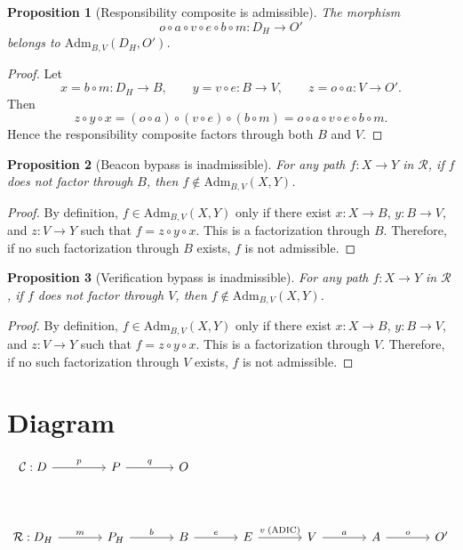 \documentclass[11pt]{article}
\newtheorem{proposition}{Proposition}
\begin{document}
\begin{proposition}[Responsibility composite is admissible]
The morphism
\[
  o\circ a\circ v\circ e\circ b\circ m:D_H\to O'
\]
belongs to $\mathrm{Adm}_{B,V}(D_H,O')$.
\end{proposition}

\begin{proof}
Let
\[
  x=b\circ m:D_H\to B,\qquad
  y=v\circ e:B\to V,\qquad
  z=o\circ a:V\to O'.
\]
Then
\[
  z\circ y\circ x
  =
  (o\circ a)\circ(v\circ e)\circ(b\circ m)
  =
  o\circ a\circ v\circ e\circ b\circ m.
\]
Hence the responsibility composite factors through both $B$ and $V$.
\end{proof}

\begin{proposition}[Beacon bypass is inadmissible]
For any path $f:X\to Y$ in $\mathcal{R}$, if $f$ does not factor through $B$,
then $f\notin \mathrm{Adm}_{B,V}(X,Y)$.
\end{proposition}

\begin{proof}
By definition, $f\in\mathrm{Adm}_{B,V}(X,Y)$ only if there exist
$x:X\to B$, $y:B\to V$, and $z:V\to Y$ such that
$f=z\circ y\circ x$.  This is a factorization through $B$.  Therefore, if no
such factorization through $B$ exists, $f$ is not admissible.
\end{proof}

\begin{proposition}[Verification bypass is inadmissible]
For any path $f:X\to Y$ in $\mathcal{R}$, if $f$ does not factor through $V$,
then $f\notin \mathrm{Adm}_{B,V}(X,Y)$.
\end{proposition}

\begin{proof}
By definition, $f\in\mathrm{Adm}_{B,V}(X,Y)$ only if there exist
$x:X\to B$, $y:B\to V$, and $z:V\to Y$ such that
$f=z\circ y\circ x$.  This is a factorization through $V$.  Therefore, if no
such factorization through $V$ exists, $f$ is not admissible.
\end{proof}

\section*{Diagram}

\[
\begin{tikzcd}[column sep=large,row sep=large]
\mathcal{C}:
  D \arrow[r,"p"] & P \arrow[r,"q"] & O
\\[1.5em]
\mathcal{R}:
  D_H \arrow[r,"m"] &
  P_H \arrow[r,"b"] &
  B \arrow[r,"e"] &
  E \arrow[r,"v\;(\mathrm{ADIC})"] &
  V \arrow[r,"a"] &
  A \arrow[r,"o"] &
  O'
\end{tikzcd}
\]
\end{document}
